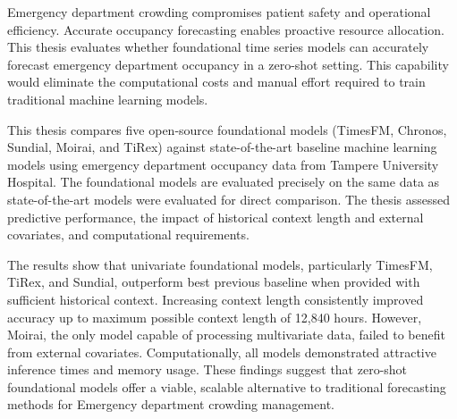 Emergency department crowding compromises patient safety and operational efficiency. Accurate occupancy forecasting enables proactive resource allocation. This thesis evaluates whether foundational time series models can accurately forecast emergency department occupancy in a zero-shot setting. This capability would eliminate the computational costs and manual effort required to train traditional machine learning models.

This thesis compares five open-source foundational models (TimesFM, Chronos, Sundial, Moirai, and TiRex) against state-of-the-art baseline machine learning models using emergency department occupancy data from Tampere University Hospital. The foundational models are evaluated precisely on the same data as state-of-the-art models were evaluated for direct comparison. The thesis assessed predictive performance, the impact of historical context length and external covariates, and computational requirements.

The results show that univariate foundational models, particularly TimesFM, TiRex, and Sundial, outperform best previous baseline when provided with sufficient historical context. Increasing context length consistently improved accuracy up to maximum possible context length of 12,840 hours. However, Moirai, the only model capable of processing multivariate data, failed to benefit from external covariates. Computationally, all models demonstrated attractive inference times and memory usage. These findings suggest that zero-shot foundational models offer a viable, scalable alternative to traditional forecasting methods for Emergency department crowding management.
